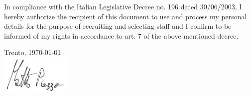 \documentclass[9pt]{developercv_mattia} %
\begin{document}




In compliance with the Italian Legislative Decree no. 196 dated 30/06/2003, I hereby authorize the recipient of this document to use and process my personal details for the purpose of recruiting and selecting staff and I confirm to be informed of my rights in accordance to art. 7 of the above mentioned decree.

\vspace{0.5cm}
Trento, \today \\

\vspace{0.2cm}
\includegraphics[width=0.25\textwidth]{../shared/firma.jpg}
\end{document}
